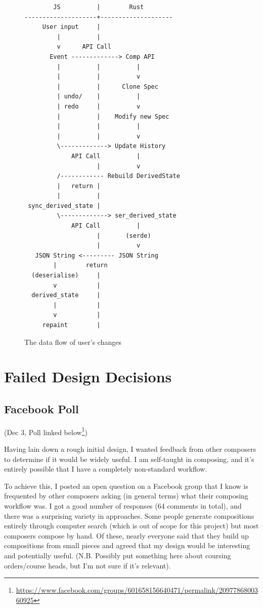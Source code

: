 \documentclass[12pt]{article}
\newcommand{\footurl}[1]{\footnote{\url{#1}}}
\begin{document}
\begin{figure}
    \centering
    \begin{BVerbatim}
        JS          |        Rust
--------------------+--------------------
     User input     |
         |          |
         v      API Call
       Event -------------> Comp API
         |          |          |
         |          |          v
         |          |      Clone Spec
         | undo/    |          |
         | redo     |          v
         |          |    Modify new Spec
         |          |          |
         |          |          v
         \-------------> Update History
             API Call          |
                    |          v
         /------------ Rebuild DerivedState
         |   return |
         |          |
 sync_derived_state |
         \-------------> ser_derived_state
             API Call          |
                    |       (serde)
                    |          v
   JSON String <--------- JSON String
        |        return
  (deserialise)     |
        v           |
  derived_state     |
        |           |
        v           |
     repaint        |
    \end{BVerbatim}
    \caption{The data flow of user's changes}\label{fig:app_data_flow}
\end{figure}



\pagebreak

\section{Failed Design Decisions}

\subsection{Facebook Poll}

(Dec 3, Poll linked
below\footurl{https://www.facebook.com/groups/601658156640471/permalink/2097786800360925})

Having lain down a rough initial design, I wanted feedback from other composers to determine if it
would be widely useful.  I am self-taught in composing, and it's entirely possible that I have a
completely non-standard workflow.

To achieve this, I posted an open question on a Facebook group that I know is frequented by other
composers asking (in general terms) what their composing workflow was.  I got a good number of
responses (64 comments in total), and there was a surprising variety in approaches.  Some people
generate compositions entirely through computer search (which is out of scope for this project) but
most composers compose by hand.  Of these, nearly everyone said that they build up compositions from
small pieces and agreed that my design would be interesting and potentially useful.  (N.B. Possibly
put something here about coursing orders/course heads, but I'm not sure if it's relevant).
\end{document}
